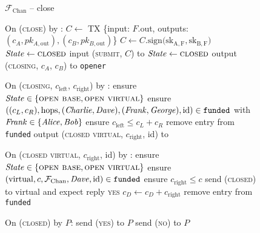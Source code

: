 \begin{figure}[H]
  \begin{systembox}{$\mathcal{F}_{\mathrm{Chan}}$ -- close}
    \begin{algorithmic}[1]
      \State On (\textsc{close}) by \alice:
      \Indent
          \State $C \gets$ TX \{input: $F$.out, outputs: $(c_A, pk_{A,
          \mathrm{out}}), (c_B, pk_{B, \mathrm{out}})$\}
          \State $C \gets C\mathrm{.sign(sk_{A, F}, sk_{B, F}}\mathrm{)}$
          \State $\mathit{State} \gets \textsc{closed}$
          \State input (\textsc{submit}, $C$) to \ledger
          \State $\mathit{State} \gets \textsc{closed}$
          \State output (\textsc{closing}, $c_A$, $c_B$) to \texttt{opener}
        \EndIf
      \EndIndent
      \Statex

      \State On (\textsc{closing}, $c_{\mathrm{left}}$, $c_{\mathrm{right}}$) by
      \fchan:
      \Indent
        \State ensure $\mathit{State} \in \{\textsc{open base}, \textsc{open
        virtual}\}$
        \State ensure $((c_L, c_R), \mathrm{hops}, (\mathit{Charlie}, \mathit{Dave}), (\mathit{Frank},
        \mathit{George}), \mathrm{id}) \in \mathtt{funded}$ with $\mathit{Frank} \in \{\mathit{Alice},
        \mathit{Bob}\}$
        \State ensure $c_{\mathrm{left}} \leq c_L + c_R$
        \State remove entry from \texttt{funded}
        \State output (\textsc{closed virtual}, $c_{\mathrm{right}}$, id) to
        \frank
      \EndIndent
      \Statex

      \State On (\textsc{closed virtual}, $c_{\mathrm{right}}$, id) by \fchan:
      \Indent
        \State ensure $\mathit{State} \in \{\textsc{open base}, \textsc{open
        virtual}\}$
        \State ensure $(\mathrm{virtual}, c, \mathcal{F}_{\mathrm{Chan}}, \mathit{Dave}, \mathrm{id}) \in
        \mathtt{funded}$
        \State ensure $c_{\mathrm{right}} \leq c$
        \State send (\textsc{closed}) to virtual and expect reply \textsc{yes}
        \State $c_D \gets c_D + c_{\mathrm{right}}$
        \State remove entry from \texttt{funded}
      \EndIndent
      \Statex

      \State On (\textsc{closed}) by $P$:
      \Indent
          \State send (\textsc{yes}) to $P$
        \Else
          \State send (\textsc{no}) to $P$
        \EndIf
      \EndIndent
    \end{algorithmic}
  \end{systembox}
  \caption{}
  \label{code:functionality:chan:skeleton:close}
\end{figure}

